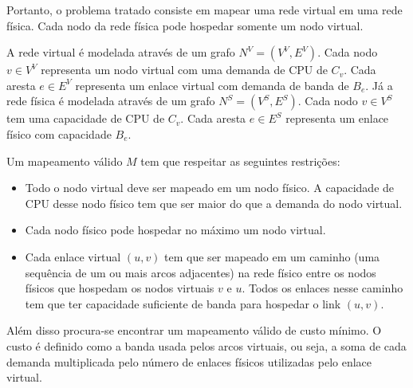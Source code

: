 \documentclass[10pt, a4paper]{article}
\begin{document}
Portanto, o problema tratado consiste em mapear uma rede virtual em uma rede física. Cada nodo da rede física pode hospedar somente um nodo virtual. 

A rede virtual é modelada através de um grafo $N^{V}=(V^{V},E^{V})$. Cada nodo $v \in V^{V}$ representa um nodo virtual com uma demanda de CPU de $C_{v}$. Cada aresta $e \in E^{V}$ representa um enlace virtual com demanda de banda de $B_{e}$. Já a rede física é modelada através de um grafo $N^{S}=(V^{S},E^{S})$. Cada nodo $v \in V^{S}$ tem uma capacidade de CPU de $C_{v}$. Cada aresta $e \in E^{S}$ representa um enlace físico com capacidade $B_{e}$.

Um mapeamento válido $M$ tem que respeitar as seguintes restrições:
\begin{itemize}
  \item Todo o nodo virtual deve ser mapeado em um nodo físico. A capacidade de CPU desse nodo físico tem que ser maior do que a demanda do nodo virtual.
  \item Cada nodo físico pode hospedar no máximo um nodo virtual.
  \item Cada enlace virtual $(u, v)$ tem que ser mapeado em um caminho (uma sequência de um ou mais arcos adjacentes) na rede físico entre os nodos físicos que hospedam os nodos virtuais $v$ e $u$. Todos os enlaces nesse caminho tem que ter capacidade suficiente de banda para hospedar o link $(u,v)$.
\end{itemize}

Além disso procura-se encontrar um mapeamento válido de custo mínimo. O custo é definido como a banda usada pelos arcos virtuais, ou seja, a soma de cada demanda multiplicada pelo número de enlaces físicos utilizadas pelo enlace virtual.



%

\end{document}
